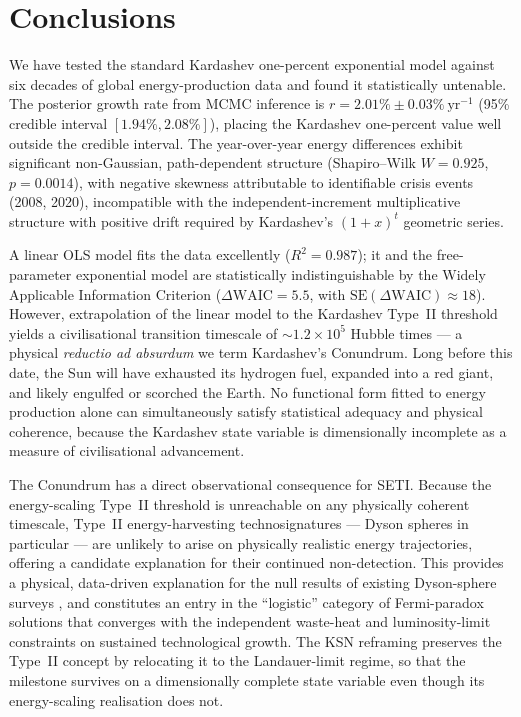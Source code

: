 \section{Conclusions}
\label{sec:conclusions}

We have tested the standard Kardashev one-percent exponential model against six decades of
global energy-production data and found it statistically untenable. The posterior growth
rate from MCMC inference is $r=2.01\%\pm0.03\%~\mathrm{yr^{-1}}$ (95\% credible interval
$[1.94\%, 2.08\%]$), placing the Kardashev one-percent value well outside the credible
interval. The year-over-year energy differences exhibit significant non-Gaussian,
path-dependent structure (Shapiro--Wilk $W=0.925$, $p=0.0014$), with negative skewness
attributable to identifiable crisis events (2008, 2020), incompatible with the
independent-increment multiplicative structure with positive drift required by Kardashev's
$(1+x)^t$ geometric series.

A linear OLS model fits the data excellently ($R^2=0.987$); it and the free-parameter
exponential model are statistically indistinguishable by the Widely Applicable Information
Criterion ($\Delta\mathrm{WAIC}=5.5$, with $\mathrm{SE}(\Delta\mathrm{WAIC})\approx18$). However, extrapolation of the linear model to the Kardashev
Type~II threshold yields a civilisational transition timescale of
$\sim1.2\times10^{5}$ Hubble times --- a physical \emph{reductio ad absurdum} we term
Kardashev's Conundrum. Long before this date, the Sun will have exhausted its hydrogen
fuel, expanded into a red giant, and likely engulfed or scorched the Earth. No functional
form fitted to energy production alone can simultaneously satisfy statistical adequacy and
physical coherence, because the Kardashev state variable is dimensionally incomplete as a
measure of civilisational advancement.

The Conundrum has a direct observational consequence for SETI. Because the energy-scaling
Type~II threshold is unreachable on any physically coherent timescale, Type~II
energy-harvesting technosignatures --- Dyson spheres in particular --- are unlikely to
arise on physically realistic energy trajectories, offering a candidate explanation for
their continued non-detection. This provides a physical, data-driven
explanation for the null results of existing Dyson-sphere surveys
\citep{Carrigan2009,Wright2014,Suazo2024}, and constitutes an entry in the ``logistic''
category of Fermi-paradox solutions \citep{Cirkovic2018} that converges with the
independent waste-heat \citep{BalbiLingam2025} and luminosity-limit \citep{HaqqMisra2025b}
constraints on sustained technological growth. The KSN reframing preserves the Type~II
concept by relocating it to the Landauer-limit regime, so that the milestone survives on a
dimensionally complete state variable even though its energy-scaling realisation does not.

